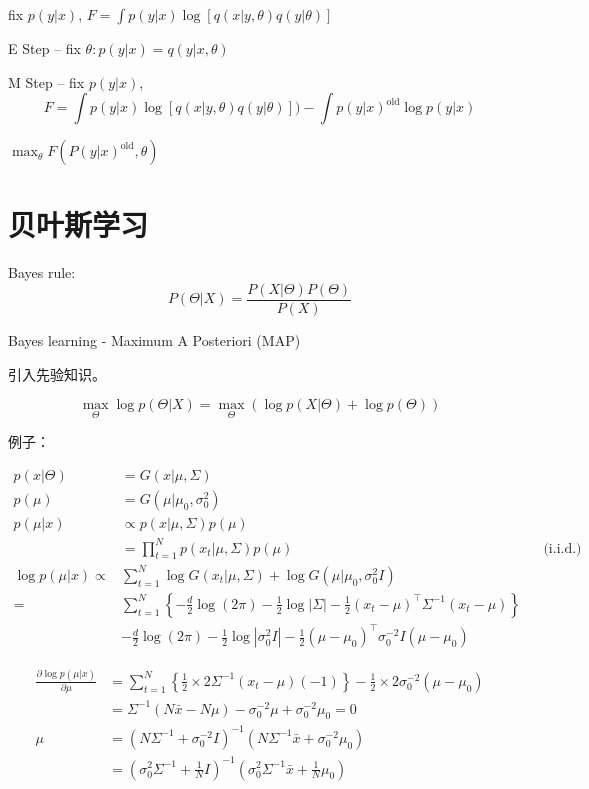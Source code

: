 fix $p(y|x)$, $F=\int p(y|x)\log[q(x|y,\theta)q(y|\theta)]$

E Step -- fix $\theta: p(y|x)=q(y|x,\theta)$

M Step -- fix $p(y|x)$, 
$$F=\int p(y|x)\log [q(x|y,\theta)q(y|\theta)]) - \int p(y|x)^\text{old}\log p(y|x)$$

$\max_\theta F(P(y|x)^\text{old},\theta)$

\section{贝叶斯学习}

Bayes rule:
\begin{equation}
	P(\Theta|X)=\frac{P(X|\Theta)P(\Theta)}{P(X)}
\end{equation}

Bayes learning - Maximum A Posteriori (MAP)

引入先验知识。

\begin{equation}
	\max_{\Theta} \log p(\Theta|X) = \max_{\Theta} (\log p(X|\Theta) + \log p(\Theta) )
\end{equation}

例子：

\begin{align*}
	p(x|\Theta) &= G(x|\mu,\Sigma) \\
	p(\mu) & = G(\mu|\mu_0,\sigma_0^2)\\
	p(\mu|x)&\propto p(x|\mu,\Sigma)p(\mu)\\
	&=\prod_{t=1}^{N}p(x_t|\mu,\Sigma)p(\mu)&&\text{(i.i.d.)}\\
	\log p(\mu|x)\propto &\sum_{t=1}^{N}\log G(x_t|\mu,\Sigma) + \log G(\mu|\mu_0, \sigma_0^2 I)\\
	=&\sum_{t=1}^{N}\left\{ -\frac{d}{2}\log (2\pi) -\frac{1}{2}\log |\Sigma| -\frac{1}{2}(x_t-\mu)^\top\Sigma^{-1}(x_t-\mu) \right\}\\
	&-\frac{d}{2}\log(2\pi)-\frac{1}{2}\log|\sigma_0^2I|-\frac{1}{2}(\mu-\mu_0)^\top\sigma_0^{-2}I(\mu-\mu_0)
\end{align*}

\begin{align*}
	\frac{\partial \log p(\mu|x)}{\partial \mu} &= \sum_{t=1}^N\left\{\frac{1}{2}\times 2\Sigma^{-1}(x_t-\mu)(-1)\right\} - \frac{1}{2}\times 2\sigma_0^{-2}(\mu-\mu_0)\\
	&=\Sigma^{-1}(N\bar{x}-N\mu)-\sigma_0^{-2}\mu + \sigma_0^{-2}\mu_0=0\\
	\mu&=(N\Sigma^{-1}+\sigma_0^{-2}I)^{-1}(N\Sigma^{-1}\bar{x}+\sigma_0^{-2}\mu_0)\\
	&=(\sigma_0^2\Sigma^{-1}+\frac{1}{N}I)^{-1}(\sigma_0^2\Sigma^{-1}\bar{x}+\frac{1}{N}\mu_0)
\end{align*}

